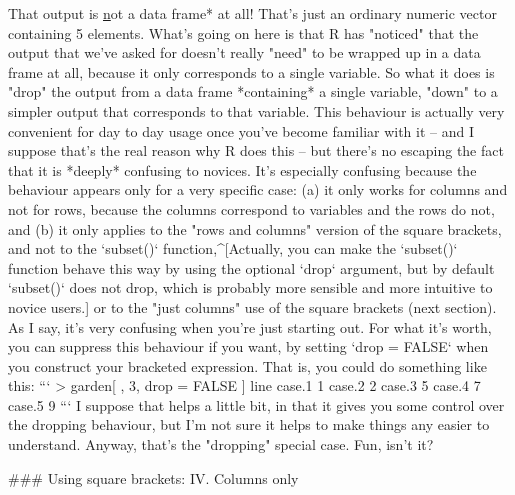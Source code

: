 That output is \underline*not a data frame* at all! That's just an ordinary numeric vector containing 5 elements. What's going on here is that R has "noticed" that the output that we've asked for doesn't really "need" to be wrapped up in a data frame at all, because it only corresponds to a single variable. So what it does is "drop" the output from a data frame *containing* a single variable, "down" to a simpler output that corresponds to that variable. This behaviour is actually very convenient for day to day usage once you've become familiar with it -- and I suppose that's the real reason why R does this -- but there's no escaping the fact that it is *deeply* confusing to novices. It's especially confusing because the behaviour appears only for a very specific case: (a) it only works for columns and not for rows, because the columns correspond to variables and the rows do not, and (b) it only applies to the "rows and columns" version of the square brackets, and not to the `subset()` function,^[Actually, you can make the `subset()` function behave this way by using the optional `drop` argument, but by default `subset()` does not drop, which is probably more sensible and more intuitive to novice users.] or to the "just columns" use of the square brackets (next section). As I say, it's very confusing when you're just starting out. For what it's worth, you can suppress this behaviour if you want, by setting `drop = FALSE` when you construct your bracketed expression. That is, you could do something like this:
```
> garden[ , 3, drop = FALSE ]
       line
case.1    1
case.2    2
case.3    5
case.4    7
case.5    9
```
I suppose that helps a little bit, in that it gives you some control over the dropping behaviour, but I'm not sure it helps to make things any easier to understand. Anyway, that's the "dropping" special case. Fun, isn't it?



### Using square brackets: IV. Columns only


